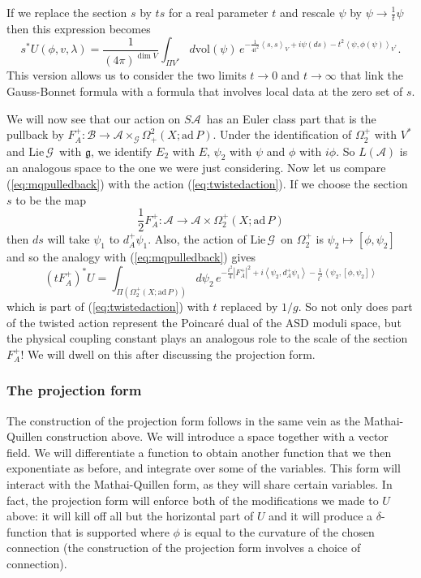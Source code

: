 \documentclass[twoside]{amsart}
\renewcommand{\eqref}[1]{(\ref{eq:#1})}
\newcommand{\enm}[1]{\ensuremath{#1}}
\renewcommand{\aa}{\enm{\mathcal{A}}}
\newcommand{\sa}{\enm{S\aa}}
\newcommand{\bb}{\enm{\mathcal{B}}}
\renewcommand{\gg}{\enm{\mathcal{G}}}
\newcommand{\g}{\enm{\mathfrak{g}}}
\newcommand{\ip}[2]{\enm{\left<#1,#2\right>}}
\newcommand{\ad}{\enm{\mathrm{ad}}}
\newcommand{\adp}{\enm{\ad\,P}}
\newcommand{\lieg}{\enm{\mathrm{Lie}\,\gg}}
\begin{document}
If we replace the section \( s \) by \( ts \) for a real parameter \( t
\) and rescale \( \psi \) by \( \psi\to \frac{1}{t}\psi \) then this
expression becomes
\begin{equation}
    s^{*}U(\phi, v, \lambda) = \frac{1}{(4\pi)^{\dim V}}
\int_{\Pi
    V^{*}}d\mathrm{vol}(\psi)\,e^{-\frac{1}{4t^{2}}\ip{s}{s}_{V}
    + i\psi(ds)
    - t^{2}\ip{\psi}{\phi(\psi)}_{V^{*}}}.
    \label{eq:mqpulledback}
\end{equation}
This version allows us to consider the two limits \( t\to 0 \) and \(
t\to\infty \) that link the Gauss-Bonnet formula with a formula that
involves local data at the zero set of \( s \).

We will now see that our action on \sa\ has an Euler class part that is
the pullback by \( F_{A}^{+}:\bb\to\aa\times_{\gg}\Omega^{2}_{+}(X;
\adp). \)
Under the identification of \( \Omega_2^+ \) with \( V^* \) and
\lieg\ with \g, we identify \( E_2 \) with \( E \), \( \psi_2 \) with
\( \psi \) and \( \phi \) with \( i\phi \).  So \( L(\aa) \) is an
analogous space to the one we were just considering.  Now let us
compare \eqref{mqpulledback} with the action \eqref{twistedaction}.
If we choose the section \( s \) to be the map
\[ \frac{1}{2}F_A^+:\aa\to\aa\times\Omega_2^+(X; \adp) \]
then \( ds \) will take \( \psi_1 \) to \( d_A^+\psi_1 \).  Also, the
action of \lieg\ on \(\Omega_2^+ \) is \( \psi_2\mapsto
[\phi,\psi_2]\) and so the analogy with \eqref{mqpulledback} gives
\begin{equation}
   \label{eq:lpartofpathintegral}
   (tF_A^+)^*U = \int_{\Pi(\Omega_2^+(X; \adp))} d\psi_2\,
   e^{-\frac{t^{2}}{4}|F_A^+|^{2}+i\ip{\psi_2}{d_A^{+}\psi_1} -
\frac{1}{t^{2}}\ip{\psi_2}{[\phi,\psi_2]} }
\end{equation}
which is part of \eqref{twistedaction} with \( t \) replaced by \( 1/g
\).  So not only does part of the twisted action represent the
Poincar\'e dual of the ASD moduli space, but the physical coupling
constant plays an analogous role to the scale of the section \(
F_{A}^{+} \)!  We will dwell on this after discussing the projection
form.
\subsubsection{The projection form}

The construction of the projection form follows in the same vein as
the Mathai-Quillen construction above.  We will introduce a space
together with a vector field.  We will differentiate a function to
obtain another function that we then exponentiate as before, and
integrate over some of the variables.  This form will interact with
the Mathai-Quillen form, as they will share certain variables.  In
fact, the projection form will enforce both of the modifications we
made to \( U \) above: it will kill off all but the horizontal
part of \( U \) and it will produce a \( \delta \)-function that
is supported where \( \phi \) is equal to the curvature of the chosen
connection (the construction of the projection form involves a choice
of connection).
\end{document}
